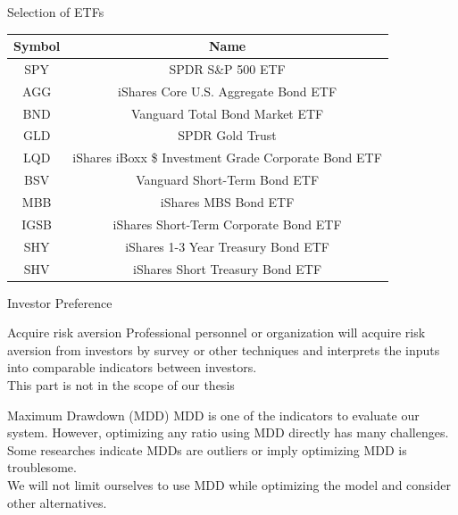 \begin{frame}{Selection of ETFs}
    \begin{tabular}{|| c | c ||}
    \hline
    Symbol & Name  \\ \hline \hline
    SPY&SPDR S\&P 500 ETF \\ \hline
    AGG&iShares Core U.S. Aggregate Bond ETF \\ \hline
    BND&Vanguard Total Bond Market ETF \\ \hline
    GLD&SPDR Gold Trust \\ \hline
    LQD&iShares iBoxx \$ Investment Grade Corporate Bond ETF \\ \hline
    BSV&Vanguard Short-Term Bond ETF \\ \hline
    MBB&iShares MBS Bond ETF \\ \hline
    IGSB&iShares Short-Term Corporate Bond ETF \\ \hline
    SHY&iShares 1-3 Year Treasury Bond ETF \\ \hline
    SHV&iShares Short Treasury Bond ETF \\ \hline
    \end{tabular}
\end{frame}



\begin{frame}{Investor Preference}
\begin{block}{Acquire risk aversion}
Professional personnel or organization will acquire risk aversion from investors by survey or other techniques and interprets the inputs into comparable indicators between investors.
\\
\alert{This part is not in the scope of our thesis}
\end{block}
\begin{block}{Maximum Drawdown (MDD)}
MDD is one of the indicators to evaluate our system. However, optimizing any ratio using MDD directly has many challenges. Some researches indicate MDDs are outliers or imply optimizing MDD is troublesome. 
\\
\alert{We will not limit ourselves to use MDD while optimizing the model and consider other alternatives.}
\end{block}
\end{frame}



